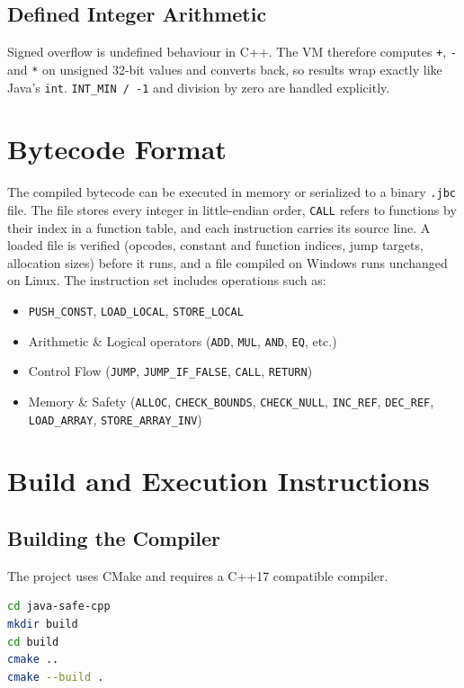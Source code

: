 \documentclass[12pt, a4paper]{article}
\begin{document}
\subsection{Defined Integer Arithmetic}
Signed overflow is undefined behaviour in C++. The VM therefore computes \texttt{+}, \texttt{-} and \texttt{*} on unsigned 32-bit values and converts back, so results wrap exactly like Java's \texttt{int}. \texttt{INT\_MIN / -1} and division by zero are handled explicitly.

\section{Bytecode Format}
The compiled bytecode can be executed in memory or serialized to a binary \texttt{.jbc} file. The file stores every integer in little-endian order, \texttt{CALL} refers to functions by their index in a function table, and each instruction carries its source line. A loaded file is verified (opcodes, constant and function indices, jump targets, allocation sizes) before it runs, and a file compiled on Windows runs unchanged on Linux. The instruction set includes operations such as:
\begin{itemize}
    \item \texttt{PUSH\_CONST}, \texttt{LOAD\_LOCAL}, \texttt{STORE\_LOCAL}
    \item Arithmetic \& Logical operators (\texttt{ADD}, \texttt{MUL}, \texttt{AND}, \texttt{EQ}, etc.)
    \item Control Flow (\texttt{JUMP}, \texttt{JUMP\_IF\_FALSE}, \texttt{CALL}, \texttt{RETURN})
    \item Memory \& Safety (\texttt{ALLOC}, \texttt{CHECK\_BOUNDS}, \texttt{CHECK\_NULL}, \texttt{INC\_REF}, \texttt{DEC\_REF}, \texttt{LOAD\_ARRAY}, \texttt{STORE\_ARRAY\_INV})
\end{itemize}

\section{Build and Execution Instructions}

\subsection{Building the Compiler}
The project uses CMake and requires a C++17 compatible compiler.
\begin{lstlisting}[language=bash]
cd java-safe-cpp
mkdir build
cd build
cmake ..
cmake --build .
\end{lstlisting}
\end{document}
